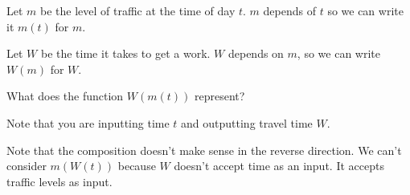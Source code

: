 \documentclass{ximera}
\begin{document}
\begin{question}
Let $m$ be the level of traffic at the time of day $t$. $m$ depends of $t$ so we can write it $m(t)$ for $m$.

Let $W$ be the time it takes to get a work. $W$ depends on $m$, so we can write $W(m)$ for $W$.

What does the function $W(m(t))$ represent?
\begin{solution}
\begin{multiple-choice}
\end{multiple-choice}
\begin{hint}
Note that you are inputting time $t$ and outputting travel time $W$. 
\end{hint}

Note that the composition doesn't make sense in the reverse direction. We can't consider $m(W(t))$ because $W$ doesn't accept time as an input. It accepts traffic levels as input.
\end{solution}
\end{question}
\end{document}
